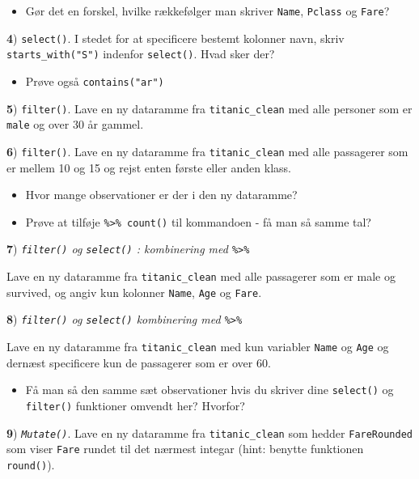 \documentclass[
]{book}
\providecommand{\tightlist}{%
  \setlength{\itemsep}{0pt}\setlength{\parskip}{0pt}}
\begin{document}
\begin{itemize}
\tightlist
\item
  Gør det en forskel, hvilke rækkefølger man skriver \texttt{Name}, \texttt{Pclass} og \texttt{Fare}?
\end{itemize}

\textbf{4}) \texttt{select()}. I stedet for at specificere bestemt kolonner navn, skriv \texttt{starts\_with("S")} indenfor \texttt{select()}. Hvad sker der?

\begin{itemize}
\tightlist
\item
  Prøve også \texttt{contains("ar")}
\end{itemize}

\textbf{5}) \texttt{filter()}. Lave en ny dataramme fra \texttt{titanic\_clean} med alle personer som er \texttt{male} og over 30 år gammel.

\textbf{6}) \texttt{filter()}. Lave en ny dataramme fra \texttt{titanic\_clean} med alle passagerer som er mellem 10 og 15 og rejst enten første eller anden klass.

\begin{itemize}
\tightlist
\item
  Hvor mange observationer er der i den ny dataramme?
\item
  Prøve at tilføje \texttt{\%\textgreater{}\%\ count()} til kommandoen - få man så samme tal?
\end{itemize}

\textbf{7}) \emph{\texttt{filter()} og \texttt{select()} : kombinering med \texttt{\%\textgreater{}\%}}

Lave en ny dataramme fra \texttt{titanic\_clean} med alle passagerer som er male og survived, og angiv kun kolonner \texttt{Name}, \texttt{Age} og \texttt{Fare}.

\textbf{8}) \emph{\texttt{filter()} og \texttt{select()} kombinering med \texttt{\%\textgreater{}\%}}

Lave en ny dataramme fra \texttt{titanic\_clean} med kun variabler \texttt{Name} og \texttt{Age} og dernæst specificere kun de passagerer som er over 60.

\begin{itemize}
\tightlist
\item
  Få man så den samme sæt observationer hvis du skriver dine \texttt{select()} og \texttt{filter()} funktioner omvendt her? Hvorfor?
\end{itemize}

\textbf{9}) \emph{\texttt{Mutate()}}. Lave en ny dataramme fra \texttt{titanic\_clean} som hedder \texttt{FareRounded} som viser \texttt{Fare} rundet til det nærmest integar (hint: benytte funktionen \texttt{round()}).
\end{document}
